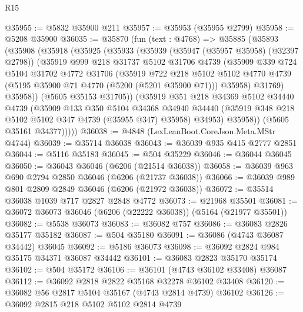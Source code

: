 \begin{lexlean}{R15}
\begin{coremodule}
{{{{{{{{{{{@35955 := @5832 @35900 @211
@35957 := @35953 (@35955 @2799)
@35958 := @5208 @35900
@36035 := @35870
    (fun (text : @4768) =>
    @35885
      (@35893
        (@35908
          (@35918
            (@35925
              (@35933
                (@35939
                  (@35947 (@35957 @35958) (@32397 @2798))
                  (@35919
                    @999
                    @218
                    @31737
                    @5102
                    @31706
                    @4739
                    (@35909
                      @339
                      @724
                      @5104
                      @31702
                      @4772
                      @31706
                      (@35919
                        @722
                        @218
                        @5102
                        @5102
                        @4770
                        @4739
                        (@5195 @35900 @71 @4770 (@5200 (@5201 @35900 @71)))
                        @35958)
                      @31769)
                    @35958))
                (@5605 @35153 @31705))
              (@35919
                @351
                @218
                @34369
                @5102
                @34440
                @4739
                (@35909
                  @133
                  @350
                  @5104
                  @34368
                  @34940
                  @34440
                  (@35919 @348 @218 @5102 @5102 @347 @4739 (@35955 @347) @35958)
                  @34953)
                @35958))
            (@5605 @35161 @34377)))))
@36038 := @4848 (LexLeanBoot.CoreJson.Meta.MStr @4744)
@36039 := @35714 @36038
@36043 := @36039 @935 @415 @2777 @2851
@36044 := @5116 @35183
@36045 := @504 @35229
@36046 := @36044 @36045
@36050 := @36043 @36046 (@6206 (@21514 @36038))
@36058 := @36039 @963 @690 @2794 @2850 @36046 (@6206 (@21737 @36038))
@36066 := @36039 @989 @801 @2809 @2849 @36046 (@6206 (@21972 @36038))
@36072 := @35514 @36038 @1039 @717 @2827 @2848 @4772
@36073 := @21968 @35501
@36081 := @36072 @36073 @36046 (@6206 (@22222 @36038)) (@5164 (@21977 @35501))
@36082 := @5538 @36073
@36083 := @36082 @757
@36086 := @36083 @2826 @35177 @35182
@36087 := @504 @35180
@36091 := @36086 (@4743 @36087 @34442) @36045
@36092 := @5186 @36073
@36098 := @36092 @2824 @984 @35175 @34371 @36087 @34442
@36101 := @36083 @2823 @35170 @35174
@36102 := @504 @35172
@36106 := @36101 (@4743 @36102 @33408) @36087
@36112 := @36092 @2818 @2822 @35168 @32278 @36102 @33408
@36120 := @36082 @56 @2817 @5104 @35167 (@4743 @2814 @4739) @36102
@36126 := @36092 @2815 @218 @5102 @5102 @2814 @4739
}}}}}}}}}}}
\end{coremodule}
\end{lexlean}
